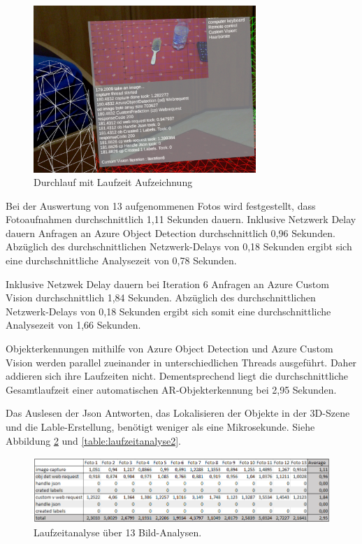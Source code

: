 \begin{figure}[H]
	\centering
	\includegraphics[width=0.75\textwidth]{images/ML_20201014_02.30.11.jpg}
	\caption[Laufzeit einer Objekterkennung]{Durchlauf mit Laufzeit Aufzeichnung}
	\label{img:laufzeit}
\end{figure}

Bei der Auswertung von 13 aufgenommenen Fotos wird festgestellt, dass Fotoaufnahmen durchschnittlich 1,11 Sekunden dauern. Inklusive Netzwerk Delay dauern Anfragen an Azure Object Detection durchschnittlich 0,96 Sekunden. Abzüglich des durchschnittlichen Netzwerk-Delays von 0,18 Sekunden ergibt sich eine durchschnittliche Analysezeit von 0,78 Sekunden. 

Inklusive Netzwek Delay dauern bei Iteration 6 Anfragen an Azure Custom Vision  durchschnittlich 1,84 Sekunden. Abzüglich des durchschnittlichen Netzwerk-Delays von 0,18 Sekunden ergibt sich somit eine durchschnittliche Analysezeit von 1,66 Sekunden.

Objekterkennungen mithilfe von Azure Object Detection und Azure Custom Vision werden parallel zueinander in unterschiedlichen Threads ausgeführt. Daher addieren sich ihre Laufzeiten nicht. Dementsprechend liegt die durchschnittliche Gesamtlaufzeit einer automatischen AR-Objekterkennung bei 2,95 Sekunden.

Das Auslesen der Json Antworten, das Lokalisieren der Objekte in der 3D-Szene und die Lable-Erstellung, benötigt weniger als eine Mikrosekunde. Siehe Abbildung \ref{table:laufzeitanalyse} und \ref{table:laufzeitanalyse2}.

\begin{figure}[H]
	\centering
	\includegraphics[width=1.1\textwidth]{images/table_Laufzeitanalyseneu.PNG}
	\caption[Laufzeitanalyse über 13 Bild-Analysen]{Laufzeitanalyse über 13 Bild-Analysen.}
	\label{table:laufzeitanalyse}
\end{figure}

